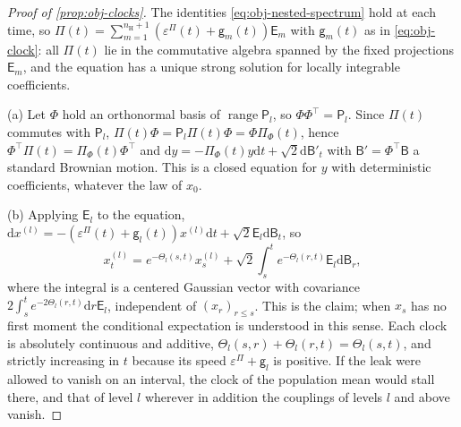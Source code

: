 \begin{proof}[Proof of \cref{prop:obj-clocks}]
The identities \eqref{eq:obj-nested-spectrum} hold at each time, so $\Pi(t)=\sum_{m=1}^{n_{\mathrm H}+1}(\varepsilon^\Pi(t)+\mathsf g_m(t))\mathsf E_m$ with $\mathsf g_m(t)$ as in \eqref{eq:obj-clock}: all $\Pi(t)$ lie in the commutative algebra spanned by the fixed projections $\mathsf E_m$, and the equation has a unique strong solution for locally integrable coefficients.

(a) Let $\Phi$ hold an orthonormal basis of $\operatorname{range}\mathsf P_l$, so $\Phi\Phi^\top=\mathsf P_l$. Since $\Pi(t)$ commutes with $\mathsf P_l$, $\Pi(t)\Phi=\mathsf P_l\Pi(t)\Phi=\Phi\Pi_\Phi(t)$, hence $\Phi^\top\Pi(t)=\Pi_\Phi(t)\Phi^\top$ and $\mathrm dy=-\Pi_\Phi(t)y\mathrm dt+\sqrt2\mathrm d\mathsf B'_t$ with $\mathsf B'=\Phi^\top\mathsf B$ a standard Brownian motion. This is a closed equation for $y$ with deterministic coefficients, whatever the law of $x_0$.

(b) Applying $\mathsf E_l$ to the equation, $\mathrm dx^{(l)}=-(\varepsilon^\Pi(t)+\mathsf g_l(t))x^{(l)}\mathrm dt+\sqrt2\mathsf E_l\mathrm d\mathsf B_t$, so
\[
x^{(l)}_t=e^{-\Theta_l(s,t)}x^{(l)}_s+\sqrt2\int_s^te^{-\Theta_l(r,t)}\mathsf E_l\mathrm d\mathsf B_r,
\]
where the integral is a centered Gaussian vector with covariance $2\int_s^te^{-2\Theta_l(r,t)}\mathrm dr\mathsf E_l$, independent of $(x_r)_{r\le s}$. This is the claim; when $x_s$ has no first moment the conditional expectation is understood in this sense. Each clock is absolutely continuous and additive, $\Theta_l(s,r)+\Theta_l(r,t)=\Theta_l(s,t)$, and strictly increasing in $t$ because its speed $\varepsilon^\Pi+\mathsf g_l$ is positive. If the leak were allowed to vanish on an interval, the clock of the population mean would stall there, and that of level $l$ wherever in addition the couplings of levels $l$ and above vanish.


\end{proof}
